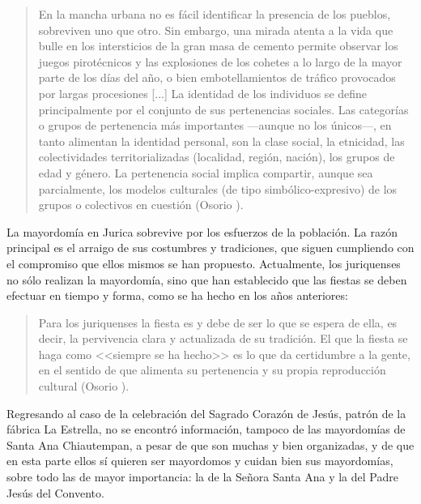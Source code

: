 \documentclass[14pt,letterpaper,twoside]{extbook} %
\begin{document}
\begin{quotation}
\noindent En la mancha urbana no es fácil identificar la presencia de los pueblos, sobreviven uno que otro. Sin embargo, una mirada atenta a la vida que bulle en los intersticios de la gran masa de cemento permite observar los juegos pirotécnicos y las explosiones de los cohetes a lo largo de la mayor parte de los días del año, o bien embotellamientos de tráfico provocados por largas procesiones [...] La identidad de los individuos se define principalmente por el conjunto de sus pertenencias sociales. Las categorías o grupos de pertenencia más importantes ---aunque no los únicos---, en tanto alimentan la identidad personal, son la clase social, la etnicidad, las colectividades territorializadas (localidad, región, nación), los grupos de edad y género. La pertenencia social implica compartir, aunque sea parcialmente, los modelos culturales (de tipo simbólico-expresivo) de los grupos o colectivos en cuestión (Osorio ).
\end{quotation}

\noindent La mayordomía en Jurica sobrevive por los esfuerzos de la población. La razón principal es el arraigo de sus costumbres y tradiciones, que siguen cumpliendo con el compromiso que ellos mismos se han propuesto. Actualmente, los juriquenses no sólo realizan la mayordomía, sino que han establecido que las fiestas se deben efectuar en tiempo y forma, como se ha hecho en los años anteriores:

\begin{quotation}
\noindent Para los juriquenses la fiesta es y debe de ser lo que se espera de ella, es decir, la pervivencia clara y actualizada de su tradición. El que la fiesta se haga como <<siempre se ha hecho>> es lo que da certidumbre a la gente, en el sentido de que alimenta su pertenencia y su propia reproducción cultural (Osorio ).
\end{quotation}

\noindent Regresando al caso de la celebración del Sagrado Corazón de Jesús, patrón de la fábrica La Estrella, no se encontró información, tampoco de las mayordomías de Santa Ana Chiautempan, a pesar de que son muchas y bien organizadas, y de que en esta parte ellos sí quieren ser mayordomos y cuidan bien sus mayordomías, sobre todo las de mayor importancia: la de la Señora Santa Ana y la del Padre Jesús del Convento.
\end{document}
